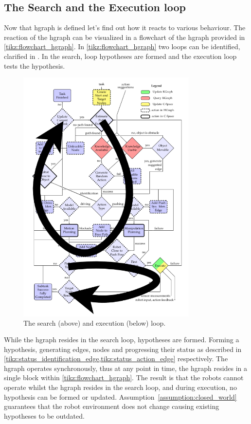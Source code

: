 \subsection{The Search and the Execution loop}%
\label{subsec:two_loops}
Now that \ac{hgraph} is defined let's find out how it reacts to various behaviour. The reaction of the \ac{hgraph} can be visualized in a flowchart of the \ac{hgraph} provided in \cref{tikz:flowchart_hgraph}. In \cref{tikz:flowchart_hgraph} two loops can be identified, clarified in . In the search, loop hypotheses are formed and the execution loop tests the hypothesis.\bs

\begin{figure}[H]
    \centering
    \includegraphics[width=9cm]{figures/two_loops_identified}
    \caption{The search (above) and execution (below) loop.}%
    \label{fig:two_loops_identified}
\end{figure}

While the \ac{hgraph} resides in the search loop, hypotheses are formed. Forming a hypothesis, generating edges, nodes and progressing their status as described in \cref{tikz:status_identification_edge,tikz:status_action_edge} respectively. The \ac{hgraph} operates synchronously, thus at any point in time, the \ac{hgraph} resides in a single block within \cref{tikz:flowchart_hgraph}. The result is that the robots cannot operate whilst the \ac{hgraph} resides in the search loop, and during execution, no hypothesis can be formed or updated. Assumption~\ref{assumption:closed_world} guarantees that the robot environment does not change causing existing hypotheses to be outdated.\bs

